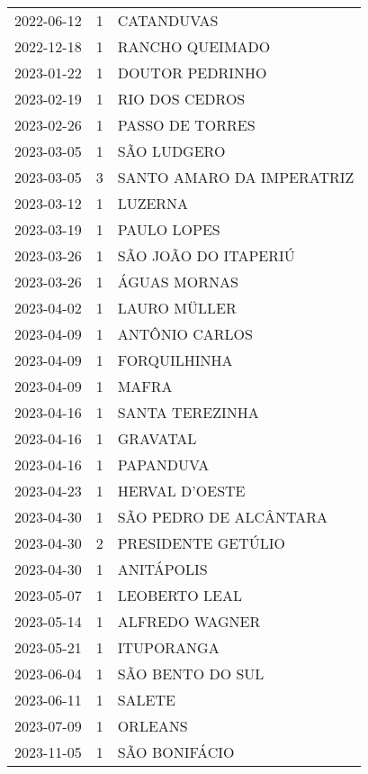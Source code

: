 \documentclass[
	12pt,				%
	openright,			%
	oneside,			%
	a4paper,			%
	english,			%
	french,				%
	spanish,			%
	brazil				%
	dvipsnames, table]{abntex2}
\begin{document}
\begin{longtable}[htbp]{ccl}
2022-06-12 & 1 & CATANDUVAS \\
2022-12-18 & 1 & RANCHO QUEIMADO \\
2023-01-22 & 1 & DOUTOR PEDRINHO \\
2023-02-19 & 1 & RIO DOS CEDROS \\
2023-02-26 & 1 & PASSO DE TORRES \\
2023-03-05 & 1 & SÃO LUDGERO \\
2023-03-05 & 3 & SANTO AMARO DA IMPERATRIZ \\
2023-03-12 & 1 & LUZERNA \\
2023-03-19 & 1 & PAULO LOPES \\
2023-03-26 & 1 & SÃO JOÃO DO ITAPERIÚ \\
2023-03-26 & 1 & ÁGUAS MORNAS \\
2023-04-02 & 1 & LAURO MÜLLER \\
2023-04-09 & 1 & ANTÔNIO CARLOS \\
2023-04-09 & 1 & FORQUILHINHA \\
2023-04-09 & 1 & MAFRA \\
2023-04-16 & 1 & SANTA TEREZINHA \\
2023-04-16 & 1 & GRAVATAL \\
2023-04-16 & 1 & PAPANDUVA \\
2023-04-23 & 1 & HERVAL D'OESTE \\
2023-04-30 & 1 & SÃO PEDRO DE ALCÂNTARA \\
2023-04-30 & 2 & PRESIDENTE GETÚLIO \\
2023-04-30 & 1 & ANITÁPOLIS \\
2023-05-07 & 1 & LEOBERTO LEAL \\
2023-05-14 & 1 & ALFREDO WAGNER \\
2023-05-21 & 1 & ITUPORANGA \\
2023-06-04 & 1 & SÃO BENTO DO SUL \\
2023-06-11 & 1 & SALETE \\
2023-07-09 & 1 & ORLEANS \\
2023-11-05 & 1 & SÃO BONIFÁCIO \\
\end{longtable}
\end{document}
